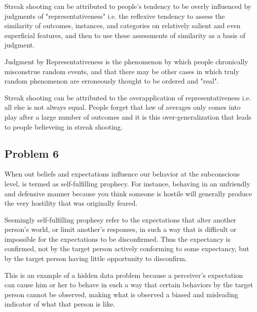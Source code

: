 \documentclass[12pt,a4paper]{article}
\begin{document}
Streak shooting can be attributed to people's tendency to be overly influenced by judgments of "representativeness" i.e. the reflexive tendency to assess the similarity of outcomes, instances, and categories on relatively salient and even superficial features, and then to use these assessments of similarity as a basis of judgment.

Judgment by Representativeness is the phenomenon by which people chronically misconstrue random events, and that there may be other cases in which truly random phenomenon are erroneously thought to be ordered and "real".

Streak shooting can be attributed to the overapplication of representativeness i.e. all else is not always equal. People forget that law of averages only comes into play after a large number of outcomes and it is this over-generalization that leads to people believeing in streak shooting.

\subsection*{Problem 6}

When out beliefs and expectations influence our behavior at the subconscious level, is termed as self-fulfilling prophecy. For instance, behaving in an unfriendly and defensive manner because you think someone is hostile will generally produce the very hostility that was originally feared.

Seemingly self-fulfilling prophesy  refer to the expectations that alter another person's world, or limit another's responses, in such a way that is difficult or impossible for the expectations to be disconfirmed. Thus the expectancy is confirmed, not by the target person actively conforming to some expectancy, but by the target person having little opportunity to disconfirm.

This is an example of a hidden data problem because a perceiver's expectation can cause him or her to behave in such a way that certain behaviors by the target person cannot be observed, making what is observed a biased and misleading indicator of what that person is like.
\end{document}
